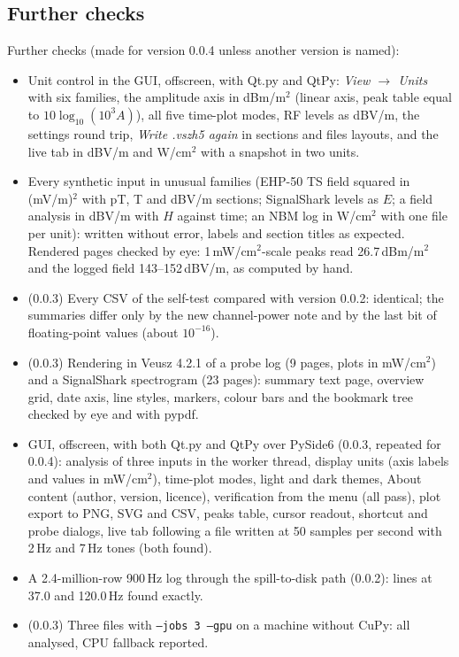\documentclass[10pt,letterpaper]{article}
\numberwithin{equation}{section}
\begin{document}
\subsection{Further checks}
Further checks (made for version 0.0.4 unless another version is named):
\begin{itemize}
\item Unit control in the GUI, offscreen, with Qt.py and QtPy: \emph{View
$\rightarrow$ Units} with six families, the amplitude axis in dBm/m$^2$ (linear axis,
peak table equal to $10\log_{10}(10^3 A)$), all five time-plot modes, RF levels as
dB\textmu V/m, the settings round trip, \emph{Write .vszh5 again} in sections and
files layouts, and the live tab in dB\textmu V/m and \textmu W/cm$^2$ with a
snapshot in two units.
\item Every synthetic input in unusual families (EHP-50 TS field squared in
(mV/m)$^2$ with pT, \textmu T and dB\textmu V/m sections; SignalShark levels as
$E$; a field analysis in dB\textmu V/m with $H$ against time; an NBM log in
\textmu W/cm$^2$ with one file per unit): written without error, labels and
section titles as expected. Rendered pages checked by eye: 1\,mW/cm$^2$-scale
peaks read 26.7\,dBm/m$^2$ and the logged field 143--152\,dB\textmu V/m, as
computed by hand.
\item (0.0.3) Every CSV of the self-test compared with version 0.0.2: identical; the
summaries differ only by the new channel-power note and by the last bit of
floating-point values (about $10^{-16}$).
\item (0.0.3) Rendering in Veusz 4.2.1 of a probe log (9 pages, plots in mW/cm$^2$) and a
SignalShark spectrogram (23 pages): summary text page, overview grid, date
axis, line styles, markers, colour bars and the bookmark tree checked by eye
and with pypdf.
\item GUI, offscreen, with both Qt.py and QtPy over PySide6 (0.0.3, repeated for 0.0.4): analysis of three
inputs in the worker thread, display units (axis labels and values in
mW/cm$^2$), time-plot modes, light and dark themes, About content (author,
version, licence), verification from the menu (all pass), plot export to PNG,
SVG and CSV, peaks table, cursor readout, shortcut and probe dialogs, live tab
following a file written at 50 samples per second with 2\,Hz and 7\,Hz tones
(both found).
\item A 2.4-million-row 900\,Hz log through the spill-to-disk path (0.0.2): lines
at 37.0 and 120.0\,Hz found exactly.
\item (0.0.3) Three files with \texttt{--jobs 3 --gpu} on a machine without CuPy: all
analysed, CPU fallback reported.
\end{itemize}
\end{document}
